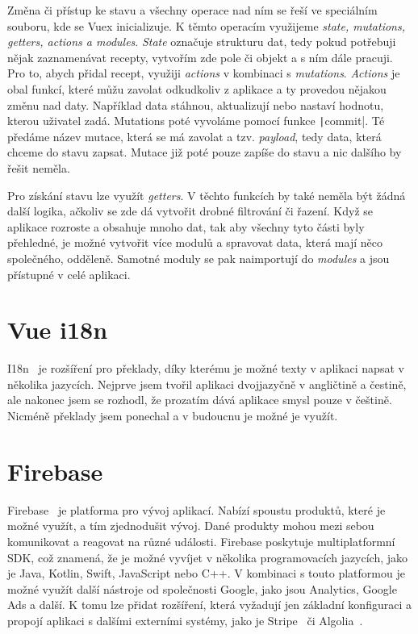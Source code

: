 Změna či přístup ke stavu a všechny operace nad ním se řeší ve speciálním souboru, kde se Vuex inicializuje. K těmto operacím využijeme \emph{state, mutations, getters, actions a modules}.
\emph{State} označuje strukturu dat, tedy pokud potřebuji nějak zaznamenávat recepty, vytvořím zde pole či objekt a s ním dále pracuji. Pro to, abych přidal recept, využiji \emph{actions} v kombinaci s
\emph{mutations}. \emph{Actions} je obal funkcí, které můžu zavolat odkudkoliv z aplikace a ty provedou nějakou změnu nad daty. Například data stáhnou, aktualizují nebo nastaví hodnotu, kterou uživatel
zadá. Mutations poté vyvoláme pomocí funkce \texttt|commit|. Té předáme název mutace, která se má zavolat a tzv. \emph{payload}, tedy data, která chceme do stavu zapsat. Mutace již poté pouze zapíše
do stavu a nic dalšího by řešit neměla.

Pro získání stavu lze využít \emph{getters}. V těchto funkcích by také neměla být žádná další logika, ačkoliv se zde dá vytvořit drobné filtrování či řazení.
Když se aplikace rozroste a obsahuje mnoho dat, tak aby všechny tyto části byly přehledné, je možné vytvořit více modulů a spravovat data, která mají něco společného,
odděleně. Samotné moduly se pak naimportují do \emph{modules} a jsou přístupné v celé aplikaci.

\section{Vue i18n}
I18n~\cite{i18n} je rozšíření pro překlady, díky kterému je možné texty v aplikaci napsat v několika jazycích. Nejprve jsem tvořil aplikaci dvojjazyčně
v angličtině a čestině, ale nakonec jsem se rozhodl, že prozatím dává aplikace smysl pouze v češtině. Nicméně překlady jsem ponechal a v budoucnu
je možné je využít.

\section{Firebase}
Firebase~\cite{Firebase} je platforma pro vývoj aplikací. Nabízí spoustu produktů, které je možné využít, a tím zjednodušit vývoj.
Dané produkty mohou mezi sebou komunikovat a reagovat na různé události. Firebase poskytuje multiplatformní SDK, což znamená, že je
možné vyvíjet v několika programovacích jazycích, jako je Java, Kotlin, Swift, JavaScript nebo C++. V kombinaci s touto platformou je možné
využít další nástroje od společnosti Google, jako jsou Analytics, Google Ads a další. K tomu lze přidat rozšíření, která vyžadují jen základní
konfiguraci a propojí aplikaci s dalšími externími systémy, jako je Stripe~\cite{Stripe} či Algolia~\cite{Algolia}.

